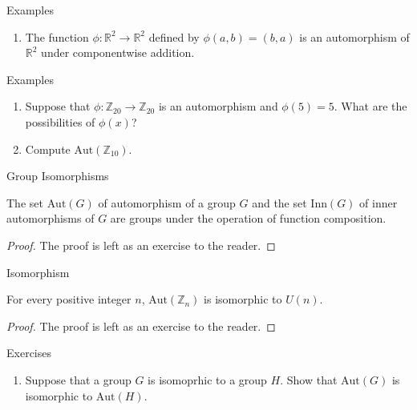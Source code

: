 \documentclass{beamer}
\begin{document}
\begin{frame}{Examples}
    \justifying
    \begin{enumerate}
        \item The function $\phi: \mathbb{R}^2 \to \mathbb{R}^2$ defined by $\phi(a, b) = (b, a)$ is an automorphism of $\mathbb{R}^2$ under componentwise addition.
    \end{enumerate}
\end{frame}

\begin{frame}{Examples}
    \justifying
    \begin{enumerate}
    \justifying
    \item Suppose that $\phi: \mathbb{Z}_{20} \to \mathbb{Z}_{20}$ is an automorphism and $\phi(5) = 5$. What are the possibilities of $\phi(x)$?
        \item Compute $\text{Aut}(\mathbb{Z}_{10})$. 
    \end{enumerate}
\end{frame}

\begin{frame}{Group Isomorphisms}
    \begin{theorem}
        \justifying
        The set $\text{Aut}(G)$ of automorphism of a group $G$ and the set $\text{Inn}(G)$ of inner automorphisms of $G$ are groups under the operation of function composition.
    \end{theorem}
    \pause
    \begin{proof}
        The proof is left as an exercise to the reader.
    \end{proof}
\end{frame}

\begin{frame}{Isomorphism}
    \begin{theorem}
        \justifying
        For every positive integer $n$, $\text{Aut}(\mathbb{Z}_n)$ is isomorphic to $U(n)$.
    \end{theorem}
    \pause
    \begin{proof}
        The proof is left as an exercise to the reader.    
    \end{proof}
\end{frame}

\begin{frame}{Exercises}
    \justifying
    \begin{enumerate}
        \justifying
        \item Suppose that a group $G$ is isomoprhic to a group $H$. Show that $\text{Aut}(G)$ is isomorphic to $\text{Aut}(H)$. 
    \end{enumerate}
\end{frame}
\end{document}
